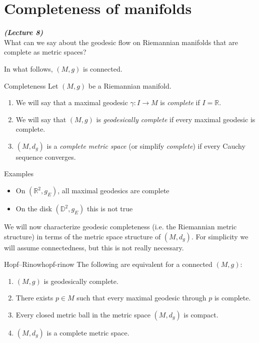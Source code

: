 









\section{Completeness of manifolds}
\vspace{0.4cm}\emph{\textbf{(Lecture 8)}}\\



What can we say about the geodesic flow on Riemannian manifolds that are complete as metric spaces?

In what follows, $(M,g)$ is connected.

\begin{colordef}{Completeness}{}
Let $(M,g)$ be a Riemannian manifold.
\begin{enumerate}
\item We will say that a maximal geodesic $\gamma \colon I \to M$ is \emph{complete} if $I = \mathbb{R}$.
\item We will say that $(M,g)$ is \emph{geodesically complete} if every maximal geodesic is complete.
\item $(M, d_g)$ is a \emph{complete metric space} (or simplify \emph{complete}) if every Cauchy sequence converges.
\end{enumerate}
\end{colordef}

Examples
\begin{itemize}[itemsep=0pt, topsep=0pt]
    \item On $(\mathbb{R}^2,g_E)$, all maximal geodesics are complete
    \item On the disk $(\mathbb{D}^2,g_E)$ this is not true\\
\end{itemize}

We will now characterize geodesic completeness (i.e. the Riemannian metric structure) in terms of the metric space structure of $(M, d_g)$. For simplicity we will assume connectedness, but this is not really necessary.

\begin{colortheo}{Hopf--Rinow}{hopf-rinow}
The following are equivalent for a connected $(M,g)$:
\begin{enumerate}
\item[(a)] $(M,g)$ is geodesically complete.
\item[(b)] There exists $p \in M$ such that every maximal geodesic through $p$ is complete.
\item[(c)] Every closed metric ball in the metric space $(M, d_g)$ is compact.
\item[(d)] $(M, d_g)$ is a complete metric space.
\end{enumerate}
\end{colortheo}


